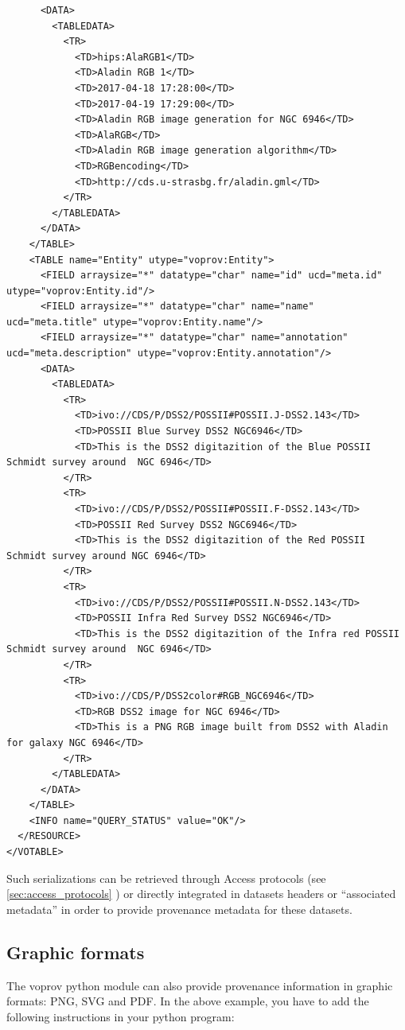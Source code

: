 \begin{verbatim}
      <DATA>
        <TABLEDATA>
          <TR>
            <TD>hips:AlaRGB1</TD>
            <TD>Aladin RGB 1</TD>
            <TD>2017-04-18 17:28:00</TD>
            <TD>2017-04-19 17:29:00</TD>
            <TD>Aladin RGB image generation for NGC 6946</TD>
            <TD>AlaRGB</TD>
            <TD>Aladin RGB image generation algorithm</TD>
            <TD>RGBencoding</TD>
            <TD>http://cds.u-strasbg.fr/aladin.gml</TD>
          </TR>
        </TABLEDATA>
      </DATA>
    </TABLE>
    <TABLE name="Entity" utype="voprov:Entity">
      <FIELD arraysize="*" datatype="char" name="id" ucd="meta.id" utype="voprov:Entity.id"/>
      <FIELD arraysize="*" datatype="char" name="name" ucd="meta.title" utype="voprov:Entity.name"/>
      <FIELD arraysize="*" datatype="char" name="annotation" ucd="meta.description" utype="voprov:Entity.annotation"/>
      <DATA>
        <TABLEDATA>
          <TR>
            <TD>ivo://CDS/P/DSS2/POSSII#POSSII.J-DSS2.143</TD>
            <TD>POSSII Blue Survey DSS2 NGC6946</TD>
            <TD>This is the DSS2 digitazition of the Blue POSSII Schmidt survey around  NGC 6946</TD>
          </TR>
          <TR>
            <TD>ivo://CDS/P/DSS2/POSSII#POSSII.F-DSS2.143</TD>
            <TD>POSSII Red Survey DSS2 NGC6946</TD>
            <TD>This is the DSS2 digitazition of the Red POSSII Schmidt survey around NGC 6946</TD>
          </TR>
          <TR>
            <TD>ivo://CDS/P/DSS2/POSSII#POSSII.N-DSS2.143</TD>
            <TD>POSSII Infra Red Survey DSS2 NGC6946</TD>
            <TD>This is the DSS2 digitazition of the Infra red POSSII Schmidt survey around  NGC 6946</TD>
          </TR>
          <TR>
            <TD>ivo://CDS/P/DSS2color#RGB_NGC6946</TD>
            <TD>RGB DSS2 image for NGC 6946</TD>
            <TD>This is a PNG RGB image built from DSS2 with Aladin for galaxy NGC 6946</TD>
          </TR>
        </TABLEDATA>
      </DATA>
    </TABLE>
    <INFO name="QUERY_STATUS" value="OK"/>
  </RESOURCE>
</VOTABLE>

\end{verbatim}
  
Such serializations can be retrieved through Access protocols (see \ref{sec:access_protocols} ) or directly integrated in datasets headers or ``associated metadata'' in order to provide provenance metadata for these datasets. 

\subsection{Graphic formats}
\label{sec:graphic_formats}
The voprov python module can also provide provenance information in graphic formats: PNG, SVG and PDF.
In the above example, you have to add the following instructions in your python program:

